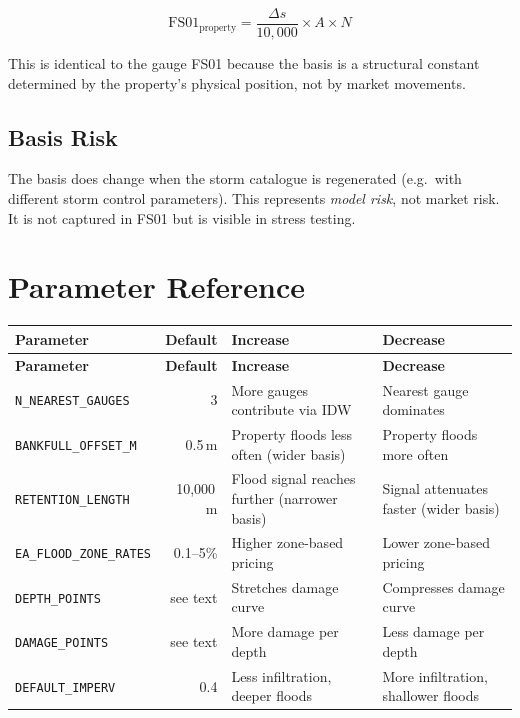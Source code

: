 \documentclass[11pt,a4paper]{article}
\begin{document}
\[
  \text{FS01}_{\mathrm{property}} = \frac{\Delta s}{10{,}000} \times A \times N
\]

\noindent This is identical to the gauge FS01 because the basis is a
structural constant determined by the property's physical position, not
by market movements.

\subsection{Basis Risk}

The basis does change when the storm catalogue is regenerated (e.g.\
with different storm control parameters).  This represents
\emph{model risk}, not market risk.  It is not captured in FS01 but
is visible in stress testing.


\section{Parameter Reference}
\label{ch:reference}

\begin{longtable}{p{4.2cm}rp{3.5cm}p{3.5cm}}
\toprule
\textbf{Parameter} & \textbf{Default} & \textbf{Increase} & \textbf{Decrease} \\
\midrule
\endfirsthead
\toprule
\textbf{Parameter} & \textbf{Default} & \textbf{Increase} & \textbf{Decrease} \\
\midrule
\endhead
\texttt{N\_NEAREST\_GAUGES} & 3 &
  More gauges contribute via IDW &
  Nearest gauge dominates \\[4pt]
\texttt{BANKFULL\_OFFSET\_M} & 0.5\,m &
  Property floods less often (wider basis) &
  Property floods more often \\[4pt]
\texttt{RETENTION\_LENGTH} & 10,000\,m &
  Flood signal reaches further (narrower basis) &
  Signal attenuates faster (wider basis) \\[4pt]
\texttt{EA\_FLOOD\_ZONE\_RATES} & 0.1--5\% &
  Higher zone-based pricing &
  Lower zone-based pricing \\[4pt]
\texttt{DEPTH\_POINTS} & see text &
  Stretches damage curve &
  Compresses damage curve \\[4pt]
\texttt{DAMAGE\_POINTS} & see text &
  More damage per depth &
  Less damage per depth \\[4pt]
\texttt{DEFAULT\_IMPERV} & 0.4 &
  Less infiltration, deeper floods &
  More infiltration, shallower floods \\
\bottomrule
\end{longtable}
\end{document}
